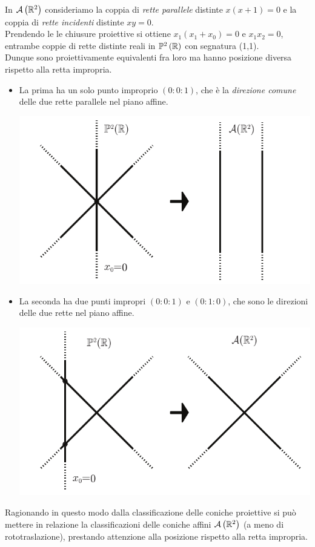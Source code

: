 \begin{example}
	In ${\mathcal{A}\left(\mathbb{R}^2\right)}$ consideriamo la coppia di \textit{rette parallele} distinte $x(x+1)=0$ e la coppia di \textit{rette incidenti} distinte $xy=0$.\\
	Prendendo le le chiusure proiettive si ottiene $x_1(x_1+x_0)=0$ e $x_1x_2=0$, entrambe coppie di rette distinte reali in $\proj[2]{\realset}$ con segnatura (1,1). \\
	Dunque sono proiettivamente equivalenti fra loro ma hanno posizione diversa rispetto alla retta impropria.
	\begin{itemize}
		\item La prima ha un solo punto improprio $(0\colon 0\colon 1)$, che è la \textit{direzione comune} delle due rette parallele nel piano affine.
		\begin{center}
			\includegraphics[trim=0cm 0cm 0cm 0cm,clip,scale=0.50]{images/projlineintersect1.pdf}
		\end{center}
		\item La seconda ha due punti impropri $(0\colon 0\colon 1)$ e $(0\colon 1\colon 0)$, che sono le direzioni delle due rette nel piano affine.
		\begin{center}
			\includegraphics[trim=0cm 0cm 0cm 0cm,clip,scale=0.50]{images/projlineintersect2.pdf}
		\end{center}
	\end{itemize}
\vspace{-3mm}
\end{example}
Ragionando in questo modo dalla classificazione delle coniche proiettive si può mettere in relazione la classificazioni delle coniche affini ${\mathcal{A}\left(\mathbb{R}^2\right)}$ (a meno di rototraslazione), prestando attenzione alla posizione rispetto alla retta impropria.
